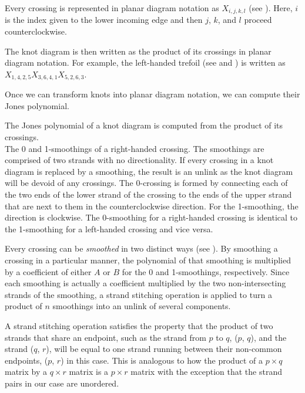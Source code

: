 \begin{paper}
Every crossing is represented in planar diagram notation as $X_{i,j,k,l}$ (see
\figX).
Here, $i$ is the index given to the lower incoming edge and then $j$, $k$, and
$l$ proceed counterclockwise.

The knot diagram is then written as the product of its crossings in planar
diagram notation.
For example, the left-handed trefoil (see \figTrefoil and \figLabeled) is
written as $X_{1,4,2,5}X_{3,6,4,1}X_{5,2,6,3}$.


Once we can transform knots into planar diagram notation, we can compute their
Jones polynomial.


The Jones polynomial of a knot diagram is computed from the product of its
crossings.\\

{The 0 and 1-smoothings of a right-handed crossing.
The smoothings are comprised of two strands with no directionality.
If every crossing in a knot diagram is replaced by a smoothing, the result is an
unlink as the knot diagram will be devoid of any crossings.
The 0-crossing is formed by connecting each of the two ends of the lower strand
of the crossing to the ends of the upper strand that are next to them in the
counterclockwise direction.
For the 1-smoothing, the direction is clockwise.
The 0-smoothing for a right-handed crossing is identical to the 1-smoothing for
a left-handed crossing and vice versa.}

Every crossing can be \textit{smoothed} in two distinct ways (see
\figSmoothings).
By smoothing a crossing in a particular manner, the polynomial of that smoothing
is multiplied by a coefficient of either $A$ or $B$ for the 0 and 1-smoothings,
respectively.
Since each smoothing is actually a coefficient multiplied by the two
non-intersecting strands of the smoothing, a strand stitching operation is
applied to turn a product of $n$ smoothings into an unlink of several
components.

A strand stitching operation satisfies the property that the product of two
strands that share an endpoint, such as the strand from $p$ to $q$, ($p$, $q$),
and the strand ($q$, $r$), will be equal to one strand running between their
non-common endpoints, ($p$, $r$) in this case.
This is analogous to how the product of a $p\times q$ matrix by a $q\times r$
matrix is a $p\times r$ matrix with the exception that the strand pairs in our
case are unordered.


\end{paper}
